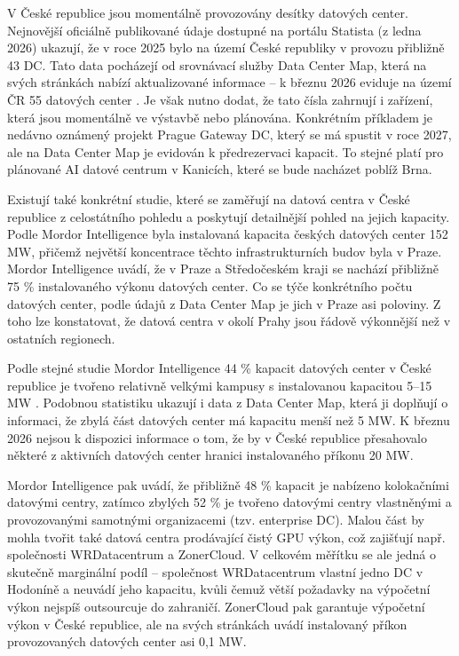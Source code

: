 V České republice jsou momentálně provozovány desítky datových center. Nejnovější oficiálně publikované údaje dostupné na portálu Statista (z ledna 2026) \cite{data_center_map_number_2025} ukazují, že v roce 2025 bylo na území České republiky v provozu přibližně 43 DC. Tato data pocházejí od srovnávací služby Data Center Map, která na svých stránkách nabízí aktualizované informace – k březnu 2026 eviduje na území ČR 55 datových center \cite{data_center_map_czech_2026}. Je však nutno dodat, že tato čísla zahrnují i zařízení, která jsou momentálně ve výstavbě nebo plánována. Konkrétním příkladem je nedávno oznámený projekt Prague Gateway DC, který se má spustit v roce 2027, ale na Data Center Map je evidován k předrezervaci kapacit. To stejné platí pro plánované AI datové centrum v Kanicích, které se bude nacházet poblíž Brna.

Existují také konkrétní studie, které se zaměřují na datová centra v České republice z celostátního pohledu a poskytují detailnější pohled na jejich kapacity. Podle Mordor Intelligence \cite{mordor_intelligence_czechia_2025} byla instalovaná kapacita českých datových center 152 MW, přičemž největší koncentrace těchto infrastrukturních budov byla v Praze. Mordor Intelligence uvádí, že v Praze a Středočeském kraji se nachází přibližně 75 \% instalovaného výkonu datových center. Co se týče konkrétního počtu datových center, podle údajů z Data Center Map je jich v Praze asi poloviny. Z toho lze konstatovat, že datová centra v okolí Prahy jsou řádově výkonnější než v ostatních regionech.

Podle stejné studie Mordor Intelligence 44 \% kapacit datových center v České republice je tvořeno relativně velkými kampusy s instalovanou kapacitou 5--15 MW \cite{mordor_intelligence_czechia_2025}. Podobnou statistiku ukazují i data z Data Center Map, která ji doplňují o informaci, že zbylá část datových center má kapacitu menší než 5 MW. K březnu 2026 nejsou k dispozici informace o tom, že by v České republice přesahovalo některé z aktivních datových center hranici instalovaného příkonu 20 MW.

Mordor Intelligence pak uvádí, že přibližně 48 \% kapacit je nabízeno kolokačními datovými centry, zatímco zbylých 52 \% je tvořeno datovými centry vlastněnými a provozovanými samotnými organizacemi (tzv. enterprise DC). Malou část by mohla tvořit také datová centra prodávající čistý GPU výkon, což zajišťují např. společnosti WRDatacentrum a ZonerCloud. V celkovém měřítku se ale jedná o skutečně marginální podíl – společnost WRDatacentrum vlastní jedno DC v Hodoníně a neuvádí jeho kapacitu, kvůli čemuž větší požadavky na výpočetní výkon nejspíš outsourcuje do zahraničí. ZonerCloud pak garantuje výpočetní výkon v České republice, ale na svých stránkách uvádí instalovaný příkon provozovaných datových center asi 0,1 MW. \cite{zonercloud_zonercloud_2026}


